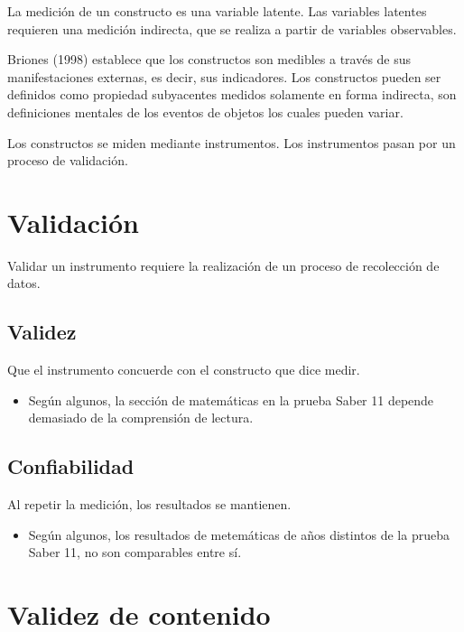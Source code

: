 \documentclass[
  letterpaper,
  DIV=11,
  numbers=noendperiod]{scrreprt}
\providecommand{\tightlist}{%
  \setlength{\itemsep}{0pt}\setlength{\parskip}{0pt}}\usepackage{longtable,booktabs,array}
\begin{document}
La medición de un constructo es una variable latente. Las variables
latentes requieren una medición indirecta, que se realiza a partir de
variables observables.

Briones (1998) establece que los constructos son medibles a través de
sus manifestaciones externas, es decir, sus indicadores. Los constructos
pueden ser definidos como propiedad subyacentes medidos solamente en
forma indirecta, son definiciones mentales de los eventos de objetos los
cuales pueden variar.

Los constructos se miden mediante instrumentos. Los instrumentos pasan
por un proceso de validación.

\section{Validación}\label{validaciuxf3n}

Validar un instrumento requiere la realización de un proceso de
recolección de datos.

\subsection{Validez}\label{validez}

Que el instrumento concuerde con el constructo que dice medir.

\begin{itemize}
\tightlist
\item
  Según algunos, la sección de matemáticas en la prueba Saber 11 depende
  demasiado de la comprensión de lectura.
\end{itemize}

\subsection{Confiabilidad}\label{confiabilidad}

Al repetir la medición, los resultados se mantienen.

\begin{itemize}
\tightlist
\item
  Según algunos, los resultados de metemáticas de años distintos de la
  prueba Saber 11, no son comparables entre sí.
\end{itemize}

\section{Validez de contenido}\label{validez-de-contenido}
\end{document}
